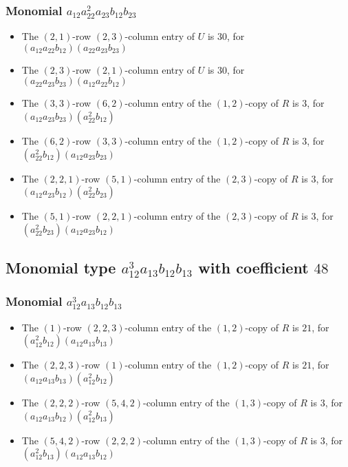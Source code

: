 \documentclass{article}
\begin{document}
\subsubsection{Monomial $ a_{12} a_{22}^{2} a_{23} b_{12} b_{23} $}

\begin{itemize}
\item The $ \left(2, 1\right) $-row $ \left(2, 3\right) $-column entry of $U$ is $ 30 $, for $( a_{12} a_{22} b_{12} )( a_{22} a_{23} b_{23} )$ 
\item The $ \left(2, 3\right) $-row $ \left(2, 1\right) $-column entry of $U$ is $ 30 $, for $( a_{22} a_{23} b_{23} )( a_{12} a_{22} b_{12} )$ 
\item The $(3, 3)$-row $(6, 2)$-column entry of the $ \left(1, 2\right) $-copy of $R$ is $ 3 $, for $( a_{12} a_{23} b_{23} )( a_{22}^{2} b_{12} )$ 
\item The $(6, 2)$-row $(3, 3)$-column entry of the $ \left(1, 2\right) $-copy of $R$ is $ 3 $, for $( a_{22}^{2} b_{12} )( a_{12} a_{23} b_{23} )$ 
\item The $(2, 2, 1)$-row $(5, 1)$-column entry of the $ \left(2, 3\right) $-copy of $R$ is $ 3 $, for $( a_{12} a_{23} b_{12} )( a_{22}^{2} b_{23} )$ 
\item The $(5, 1)$-row $(2, 2, 1)$-column entry of the $ \left(2, 3\right) $-copy of $R$ is $ 3 $, for $( a_{22}^{2} b_{23} )( a_{12} a_{23} b_{12} )$ 
\end{itemize}
\subsection{Monomial type $ a_{12}^{3} a_{13} b_{12} b_{13} $ with coefficient $ 48 $}

\subsubsection{Monomial $ a_{12}^{3} a_{13} b_{12} b_{13} $}

\begin{itemize}
\item The $(1)$-row $(2, 2, 3)$-column entry of the $ \left(1, 2\right) $-copy of $R$ is $ 21 $, for $( a_{12}^{2} b_{12} )( a_{12} a_{13} b_{13} )$ 
\item The $(2, 2, 3)$-row $(1)$-column entry of the $ \left(1, 2\right) $-copy of $R$ is $ 21 $, for $( a_{12} a_{13} b_{13} )( a_{12}^{2} b_{12} )$ 
\item The $(2, 2, 2)$-row $(5, 4, 2)$-column entry of the $ \left(1, 3\right) $-copy of $R$ is $ 3 $, for $( a_{12} a_{13} b_{12} )( a_{12}^{2} b_{13} )$ 
\item The $(5, 4, 2)$-row $(2, 2, 2)$-column entry of the $ \left(1, 3\right) $-copy of $R$ is $ 3 $, for $( a_{12}^{2} b_{13} )( a_{12} a_{13} b_{12} )$ 
\end{itemize}
\end{document}
